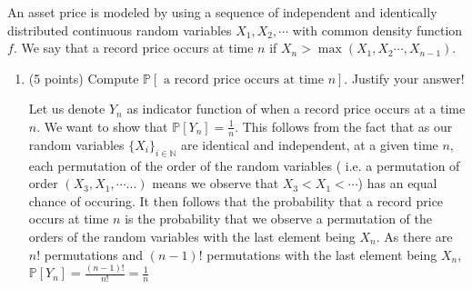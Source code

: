 \documentclass[12pt,twoside, letter]{exam}
\theoremstyle{definition}
\newcommand{\nn}{\mathbb{N}}
\begin{document}



An asset price is modeled by using a sequence of  independent and identically distributed continuous random variables $X_1,X_2,\cdots$ with common density function $f$. We say that a record price occurs  at time $n$ if $X_n>\max(X_1,X_2\cdots,X_{n-1})$.
\begin{enumerate}
	\item (5 points) Compute $\mathbb{P}[\mbox{ a record price occurs at time }n]$. Justify your answer!

    \begin{solution}
      Let us denote $Y_{n}$ as indicator function of  when a record price occurs at a time $n$. We want to show that $\mathbb{P}[Y_{n}] = \frac{1}{n}$. This follows from the fact that as 
our random variables $\{X_{i}\}_{i\in\nn}$ are identical and independent, at a given time $n$, each permutation of the order of the random variables ( i.e. a permutation of order $(X_{3}, X_{1}, \cdots ...)$ means we observe that $X_{3} < X_{1} < \cdots$) has an equal chance of occuring. It then follows that the probability that a record price occurs at time $n$ is the probability that we observe a permutation of the orders of the random variables with the last element being $X_{n}$. As there are $n!$ permutations and $(n-1)!$ permutations with the last element being $X_{n}$, 
$\mathbb{P}[Y_{n}] = \frac{(n-1)!}{n!} = \frac{1}{n}$
    \end{solution}


\end{enumerate}
\end{document}
